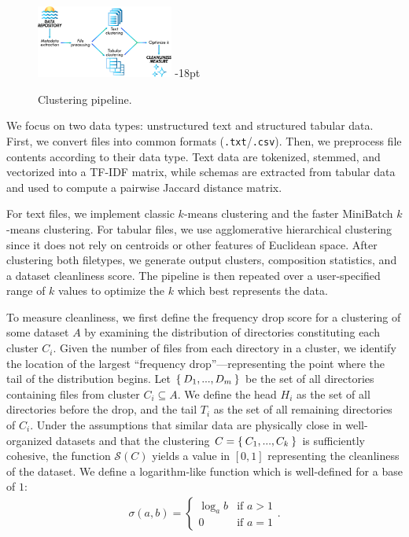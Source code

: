 \documentclass[sigconf,screen]{acmart}
\newcommand{\sub}{\subseteq}                                    %
\newcommand{\bee}{\begin{equation}\begin{aligned}}              %
\newcommand{\eee}{\end{aligned}\end{equation}}                  %
\begin{document}
\begin{center}
\begin{figure}[!htbp]
\includegraphics[width=0.4\textwidth]{pipeline.png}
\setlength{\belowcaptionskip}   {-18pt}
\caption{\label{pipeline} Clustering pipeline.}
\end{figure}
\end{center}

We focus on two data types: unstructured text and structured tabular data. 
First, we convert files into common formats (\texttt{.txt}/\texttt{.csv}). Then, we preprocess file contents according to their data type. Text data are tokenized, stemmed, and vectorized into a TF-IDF matrix, while schemas are extracted from tabular data and used to compute a pairwise Jaccard distance matrix.

For text files, we implement classic $k$-means clustering and the faster MiniBatch $k$-means clustering. For tabular files, we use agglomerative hierarchical clustering since
it does not rely on centroids or other features of Euclidean space. After clustering both filetypes, we generate output clusters, composition statistics, and a dataset cleanliness score. The pipeline is then repeated over a user-specified range of $k$ values to optimize the $k$ which best represents the data.

To measure cleanliness, we first define the frequency drop score for a clustering of some dataset $A$ by examining the distribution of directories constituting each cluster $C_i$. Given the number of files from each directory in a cluster, we identify the location of the largest ``frequency drop''---representing the point where the tail of the distribution begins. Let $\Set{D_1,...,D_m}$ be the set of all directories containing files from cluster $C_i \sub A$. We define the head $H_i$ as the set of all directories before the drop, and the tail $T_i$ as the set of all remaining directories of $C_i$. Under the assumptions that similar data are physically close in well-organized datasets and that the clustering $C = \Set{C_1,...,C_k}$ is sufficiently cohesive, the function $\mathcal{S}(C)$ yields a value in $[0,1]$ representing the cleanliness of the dataset. 
We define a logarithm-like function which is well-defined for a base of $1$:
\bee
\sigma(a,b) = 
\begin{cases}
\log_ab & \text{if }a > 1\\
0 & \text{if }a = 1
\end{cases}.
\eee
\end{document}
